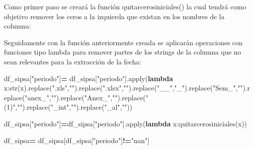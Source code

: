 \documentclass[
]{book}
\newenvironment{Shaded}{\begin{snugshade}}{\end{snugshade}}
\newcommand{\BuiltInTok}[1]{#1}
\newcommand{\ControlFlowTok}[1]{\textcolor[rgb]{0.13,0.29,0.53}{\textbf{#1}}}
\newcommand{\KeywordTok}[1]{\textcolor[rgb]{0.13,0.29,0.53}{\textbf{#1}}}
\newcommand{\NormalTok}[1]{#1}
\newcommand{\OperatorTok}[1]{\textcolor[rgb]{0.81,0.36,0.00}{\textbf{#1}}}
\newcommand{\StringTok}[1]{\textcolor[rgb]{0.31,0.60,0.02}{#1}}
\begin{document}
Como primer paso se creará la función quitarcerosiniciales() la cual tendrá como objetivo remover los ceros a la izquierda que existan en los nombres de la columna:

\begin{Shaded}
\end{Shaded}

Seguidamente con la función anteriormente creada se aplicarán operaciones con funciones tipo lambda para remover partes de los strings de la columna que no sean relevantes para la extracción de la fecha:

\begin{Shaded}
\begin{Highlighting}[]

\NormalTok{df\_sipsa[}\StringTok{"periodo"}\NormalTok{]}\OperatorTok{=}\NormalTok{ df\_sipsa[}\StringTok{"periodo"}\NormalTok{].}\BuiltInTok{apply}\NormalTok{(}\KeywordTok{lambda}\NormalTok{ x:}\BuiltInTok{str}\NormalTok{(x).replace(}\StringTok{".xls"}\NormalTok{,}\StringTok{""}\NormalTok{).replace(}\StringTok{".xlsx"}\NormalTok{,}\StringTok{""}\NormalTok{).replace(}\StringTok{"\_\_"}\NormalTok{,}\StringTok{"\_"}\NormalTok{).replace(}\StringTok{"Sem\_"}\NormalTok{,}\StringTok{""}\NormalTok{).replace(}\StringTok{"anex\_"}\NormalTok{,}\StringTok{""}\NormalTok{).replace(}\StringTok{"Anex\_"}\NormalTok{,}\StringTok{""}\NormalTok{).replace(}\StringTok{" (1)"}\NormalTok{,}\StringTok{""}\NormalTok{).replace(}\StringTok{"\_int"}\NormalTok{,}\StringTok{""}\NormalTok{).replace(}\StringTok{"\_al"}\NormalTok{,}\StringTok{""}\NormalTok{))}

\NormalTok{df\_sipsa[}\StringTok{"periodo"}\NormalTok{]}\OperatorTok{=}\NormalTok{df\_sipsa[}\StringTok{"periodo"}\NormalTok{].}\BuiltInTok{apply}\NormalTok{(}\KeywordTok{lambda}\NormalTok{ x:quitarcerosiniciales(x))}

\NormalTok{df\_sipsa}\OperatorTok{=}\NormalTok{ df\_sipsa[df\_sipsa[}\StringTok{"periodo"}\NormalTok{]}\OperatorTok{!=}\StringTok{"nan"}\NormalTok{]}
\end{Highlighting}
\end{Shaded}
\end{document}
